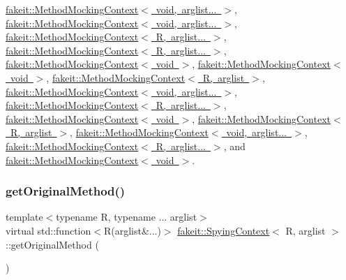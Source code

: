 \mbox{\hyperlink{classfakeit_1_1MethodMockingContext_ad413d04564c89fe134dfb7bae1a1f2a1}{fakeit\+::\+Method\+Mocking\+Context$<$ void, arglist... $>$}}, \mbox{\hyperlink{classfakeit_1_1MethodMockingContext_ad413d04564c89fe134dfb7bae1a1f2a1}{fakeit\+::\+Method\+Mocking\+Context$<$ void, arglist... $>$}}, \mbox{\hyperlink{classfakeit_1_1MethodMockingContext_ad413d04564c89fe134dfb7bae1a1f2a1}{fakeit\+::\+Method\+Mocking\+Context$<$ R, arglist... $>$}}, \mbox{\hyperlink{classfakeit_1_1MethodMockingContext_ad413d04564c89fe134dfb7bae1a1f2a1}{fakeit\+::\+Method\+Mocking\+Context$<$ R, arglist... $>$}}, \mbox{\hyperlink{classfakeit_1_1MethodMockingContext_ad413d04564c89fe134dfb7bae1a1f2a1}{fakeit\+::\+Method\+Mocking\+Context$<$ void $>$}}, \mbox{\hyperlink{classfakeit_1_1MethodMockingContext_ad413d04564c89fe134dfb7bae1a1f2a1}{fakeit\+::\+Method\+Mocking\+Context$<$ void $>$}}, \mbox{\hyperlink{classfakeit_1_1MethodMockingContext_ad413d04564c89fe134dfb7bae1a1f2a1}{fakeit\+::\+Method\+Mocking\+Context$<$ R, arglist $>$}}, \mbox{\hyperlink{classfakeit_1_1MethodMockingContext_ad413d04564c89fe134dfb7bae1a1f2a1}{fakeit\+::\+Method\+Mocking\+Context$<$ void, arglist... $>$}}, \mbox{\hyperlink{classfakeit_1_1MethodMockingContext_ad413d04564c89fe134dfb7bae1a1f2a1}{fakeit\+::\+Method\+Mocking\+Context$<$ R, arglist... $>$}}, \mbox{\hyperlink{classfakeit_1_1MethodMockingContext_ad413d04564c89fe134dfb7bae1a1f2a1}{fakeit\+::\+Method\+Mocking\+Context$<$ void $>$}}, \mbox{\hyperlink{classfakeit_1_1MethodMockingContext_ad413d04564c89fe134dfb7bae1a1f2a1}{fakeit\+::\+Method\+Mocking\+Context$<$ R, arglist $>$}}, \mbox{\hyperlink{classfakeit_1_1MethodMockingContext_ad413d04564c89fe134dfb7bae1a1f2a1}{fakeit\+::\+Method\+Mocking\+Context$<$ void, arglist... $>$}}, \mbox{\hyperlink{classfakeit_1_1MethodMockingContext_ad413d04564c89fe134dfb7bae1a1f2a1}{fakeit\+::\+Method\+Mocking\+Context$<$ R, arglist... $>$}}, and \mbox{\hyperlink{classfakeit_1_1MethodMockingContext_ad413d04564c89fe134dfb7bae1a1f2a1}{fakeit\+::\+Method\+Mocking\+Context$<$ void $>$}}.

\mbox{\label{structfakeit_1_1SpyingContext_ad93f55614a19d084778f2ca96aca8037}} 
\subsubsection{\texorpdfstring{getOriginalMethod()}{getOriginalMethod()}\hspace{0.1cm}{\footnotesize\ttfamily [1/9]}}
{\footnotesize\ttfamily template$<$typename R, typename ... arglist$>$ \\
virtual std\+::function$<$R(arglist\&...)$>$ \mbox{\hyperlink{structfakeit_1_1SpyingContext}{fakeit\+::\+Spying\+Context}}$<$ R, arglist $>$\+::get\+Original\+Method (\begin{DoxyParamCaption}{ }\end{DoxyParamCaption})\hspace{0.3cm}{\ttfamily [pure virtual]}}

